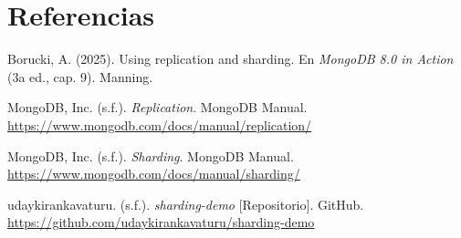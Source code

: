 \documentclass[12pt]{article}
\begin{document}
\section*{Referencias}

\begin{list}{}{%
    \setlength{\leftmargin}{1.27cm}
    \setlength{\itemindent}{-1.27cm}
    \setlength{\itemsep}{6pt}
    \setlength{\parsep}{0pt}}
\item Borucki, A. (2025). Using replication and sharding. En \textit{MongoDB 8.0 in Action} (3a ed., cap. 9). Manning.
\item MongoDB, Inc. (s.f.). \textit{Replication}. MongoDB Manual. \url{https://www.mongodb.com/docs/manual/replication/}
\item MongoDB, Inc. (s.f.). \textit{Sharding}. MongoDB Manual. \url{https://www.mongodb.com/docs/manual/sharding/}
\item udaykirankavaturu. (s.f.). \textit{sharding-demo} [Repositorio]. GitHub. \url{https://github.com/udaykirankavaturu/sharding-demo}
\end{list}
\end{document}
